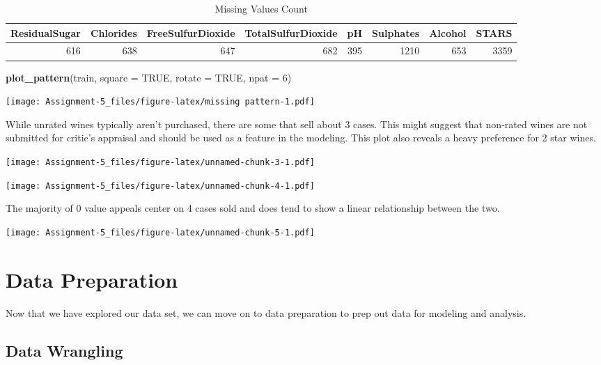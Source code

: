 \documentclass[
]{article}
\newenvironment{Shaded}{\begin{snugshade}}{\end{snugshade}}
\newcommand{\AttributeTok}[1]{\textcolor[rgb]{0.13,0.29,0.53}{#1}}
\newcommand{\ConstantTok}[1]{\textcolor[rgb]{0.56,0.35,0.01}{#1}}
\newcommand{\DecValTok}[1]{\textcolor[rgb]{0.00,0.00,0.81}{#1}}
\newcommand{\FunctionTok}[1]{\textcolor[rgb]{0.13,0.29,0.53}{\textbf{#1}}}
\newcommand{\NormalTok}[1]{#1}
\begin{document}
\begin{table}[H]
\centering\centering
\caption{\label{tab:missing-values}Missing Values Count}
\centering
\begin{tabular}[t]{r|r|r|r|r|r|r|r}
\hline
ResidualSugar & Chlorides & FreeSulfurDioxide & TotalSulfurDioxide & pH & Sulphates & Alcohol & STARS\\
\hline
616 & 638 & 647 & 682 & 395 & 1210 & 653 & 3359\\
\hline
\end{tabular}
\end{table}

\begin{Shaded}
\begin{Highlighting}[]
\FunctionTok{plot\_pattern}\NormalTok{(train, }\AttributeTok{square =} \ConstantTok{TRUE}\NormalTok{, }\AttributeTok{rotate =} \ConstantTok{TRUE}\NormalTok{, }\AttributeTok{npat =} \DecValTok{6}\NormalTok{)}
\end{Highlighting}
\end{Shaded}

\texttt{[image: Assignment-5\_files/figure-latex/missing pattern-1.pdf]}

While unrated wines typically aren't purchased, there are some that sell
about 3 cases. This might suggest that non-rated wines are not submitted
for critic's appraisal and should be used as a feature in the modeling.
This plot also reveals a heavy preference for 2 star wines.

\texttt{[image: Assignment-5\_files/figure-latex/unnamed-chunk-3-1.pdf]}

\texttt{[image: Assignment-5\_files/figure-latex/unnamed-chunk-4-1.pdf]}

The majority of 0 value appeals center on 4 cases sold and does tend to
show a linear relationship between the two. \newline

\texttt{[image: Assignment-5\_files/figure-latex/unnamed-chunk-5-1.pdf]}

\section{Data Preparation}\label{data-preparation}

Now that we have explored our data set, we can move on to data
preparation to prep out data for modeling and analysis.

\subsection{Data Wrangling}\label{data-wrangling}
\end{document}
